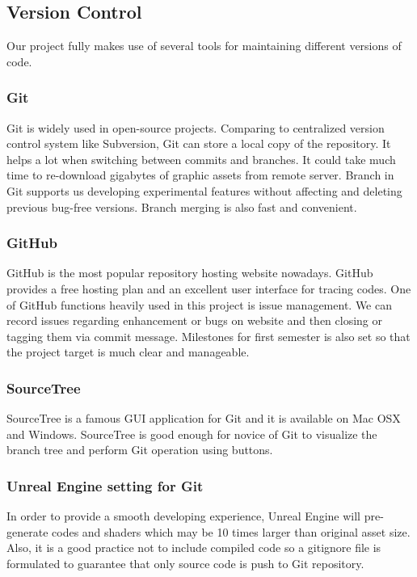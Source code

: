 \documentclass{article}
\begin{document}
\subsection{Version Control}
Our project fully makes use of several tools for maintaining different versions of code.
\subsubsection{Git}
Git is widely used in open-source projects. Comparing to centralized version control system like Subversion, Git can store a local copy of the repository. It helps a lot when switching between commits and branches. It could take much time to re-download gigabytes of graphic assets from remote server. Branch in Git supports us developing experimental features without affecting and deleting previous bug-free versions. Branch merging is also fast and convenient. 

\subsubsection{GitHub}
GitHub is the most popular repository hosting website nowadays. GitHub provides a free hosting plan and an excellent user interface for tracing codes. One of GitHub functions heavily used in this project is issue management. We can record issues regarding enhancement or bugs on website and then closing or tagging them via commit message. Milestones for first semester is also set so that the project target is much clear and manageable.

\subsubsection{SourceTree}
SourceTree is a famous GUI application for Git and it is available on Mac OSX and Windows. SourceTree is good enough for novice of Git to visualize the branch tree and perform Git operation using buttons.

\subsubsection{Unreal Engine setting for Git}
In order to provide a smooth developing experience, Unreal Engine will pre-generate codes and shaders which may be 10 times larger than original asset size. Also, it is a good practice not to include compiled code so a gitignore file is formulated to guarantee that only source code is push to Git repository.
\end{document}
